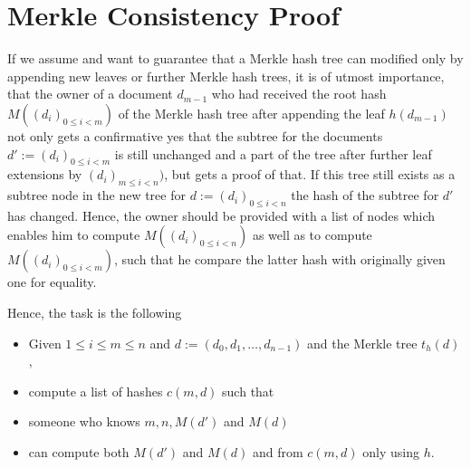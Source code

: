 \section{Merkle Consistency Proof}
If we assume and want to guarantee that a Merkle hash tree can modified only by appending new leaves or 
further Merkle hash trees, it
is of utmost importance, that the owner of a document \(d_{m-1}\) who had received
the root hash \(M((d_i)_{0 \le i < m})\) of the Merkle hash tree after appending
the leaf \(h(d_{m-1})\) not only gets a confirmative yes that the subtree 
for the documents \(d' := (d_i)_{0 \le i < m}\)
is still unchanged and a part of the tree after 
further leaf extensions by \((d_i)_{m \le i < n} )\), but gets a proof of that.
If this tree still exists as a subtree node in the new tree for \(d := (d_i)_{0\le i < n}\)
the hash of the subtree for \(d'\) has changed. Hence, the owner should be provided
with a list of nodes
which enables him to compute \(M((d_i)_{0 \le i < n})\) as well
as to compute \(M((d_i)_{0 \le i < m})\), such that he compare the latter hash with 
originally given one for equality.

Hence, the task is the following
\begin{itemize}
\item 
Given  \(1 \le i \le m \le n\) and \(d := (d_0,d_1,\ldots,d_{n-1})\) and the 
Merkle tree \(t_h(d)\),
\item 
compute a list of hashes \(c(m,d)\) such that
\item
someone who knows \(m,n,M(d')\) and \(M(d)\)
\item
can compute both \(M(d')\) and \(M(d)\) and
from \(c(m,d)\) only using \(h\).
\end{itemize}

